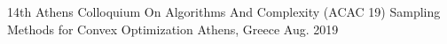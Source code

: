 

\begin{cventries}


  \cventry
    {14th Athens Colloquium On Algorithms And Complexity (ACAC 19)} %
    {Sampling Methods for Convex Optimization} %
    {Athens, Greece} %
    {Aug. 2019} %
{}

\end{cventries}
